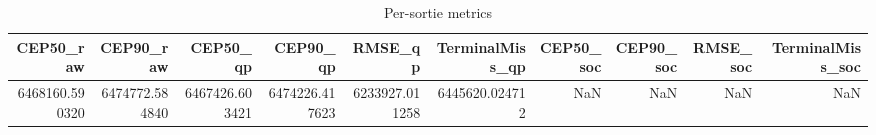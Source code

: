 \begin{table}[t]
\centering
\begin{tabular}{rrrrrrrrrr}
\toprule
CEP50_raw & CEP90_raw & CEP50_qp & CEP90_qp & RMSE_qp & TerminalMiss_qp & CEP50_soc & CEP90_soc & RMSE_soc & TerminalMiss_soc \\
\midrule
6468160.590320 & 6474772.584840 & 6467426.603421 & 6474226.417623 & 6233927.011258 & 6445620.024712 & NaN & NaN & NaN & NaN \\
\bottomrule
\end{tabular}
\caption{Per-sortie metrics}
\label{tab:per_sortie}
\end{table}
